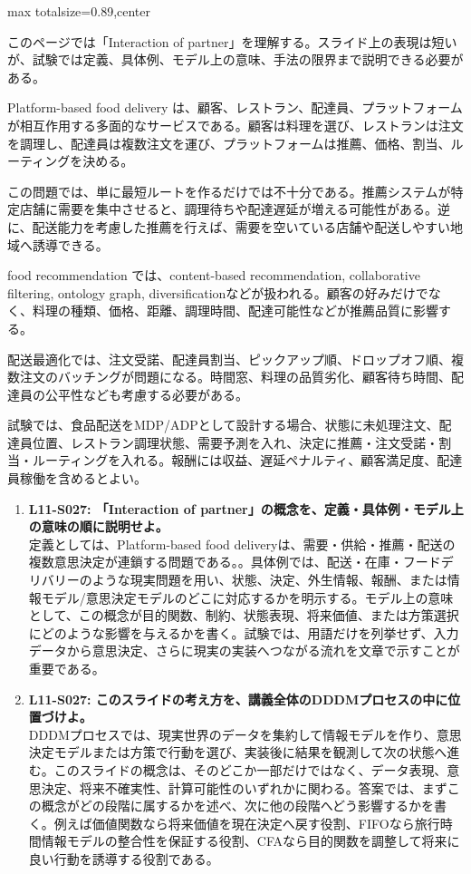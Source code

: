 \begin{minipage}[t]{0.58\textwidth}
\begin{adjustbox}{max totalsize={\textwidth}{0.89\textheight},center}
\begin{minipage}{\textwidth}\scriptsize
{}このページでは「Interaction of partner」を理解する。スライド上の表現は短いが、試験では定義、具体例、モデル上の意味、手法の限界まで説明できる必要がある。\par
Platform-based food delivery は、顧客、レストラン、配達員、プラットフォームが相互作用する多面的なサービスである。顧客は料理を選び、レストランは注文を調理し、配達員は複数注文を運び、プラットフォームは推薦、価格、割当、ルーティングを決める。\par
この問題では、単に最短ルートを作るだけでは不十分である。推薦システムが特定店舗に需要を集中させると、調理待ちや配達遅延が増える可能性がある。逆に、配送能力を考慮した推薦を行えば、需要を空いている店舗や配送しやすい地域へ誘導できる。\par
food recommendation では、content-based recommendation, collaborative filtering, ontology graph, diversificationなどが扱われる。顧客の好みだけでなく、料理の種類、価格、距離、調理時間、配達可能性などが推薦品質に影響する。\par
配送最適化では、注文受諾、配達員割当、ピックアップ順、ドロップオフ順、複数注文のバッチングが問題になる。時間窓、料理の品質劣化、顧客待ち時間、配達員の公平性なども考慮する必要がある。\par
試験では、食品配送をMDP/ADPとして設計する場合、状態に未処理注文、配達員位置、レストラン調理状態、需要予測を入れ、決定に推薦・注文受諾・割当・ルーティングを入れる。報酬には収益、遅延ペナルティ、顧客満足度、配達員稼働を含めるとよい。\par{}\begin{enumerate}\item \textbf{L11-S027: 「Interaction of partner」の概念を、定義・具体例・モデル上の意味の順に説明せよ。}\\定義としては、Platform-based food deliveryは、需要・供給・推薦・配送の複数意思決定が連鎖する問題である。。具体例では、配送・在庫・フードデリバリーのような現実問題を用い、状態、決定、外生情報、報酬、または情報モデル/意思決定モデルのどこに対応するかを明示する。モデル上の意味として、この概念が目的関数、制約、状態表現、将来価値、または方策選択にどのような影響を与えるかを書く。試験では、用語だけを列挙せず、入力データから意思決定、さらに現実の実装へつながる流れを文章で示すことが重要である。\item \textbf{L11-S027: このスライドの考え方を、講義全体のDDDMプロセスの中に位置づけよ。}\\DDDMプロセスでは、現実世界のデータを集約して情報モデルを作り、意思決定モデルまたは方策で行動を選び、実装後に結果を観測して次の状態へ進む。このスライドの概念は、そのどこか一部だけではなく、データ表現、意思決定、将来不確実性、計算可能性のいずれかに関わる。答案では、まずこの概念がどの段階に属するかを述べ、次に他の段階へどう影響するかを書く。例えば価値関数なら将来価値を現在決定へ戻す役割、FIFOなら旅行時間情報モデルの整合性を保証する役割、CFAなら目的関数を調整して将来に良い行動を誘導する役割である。\end{enumerate}

\end{minipage}
\end{adjustbox}
\end{minipage}
